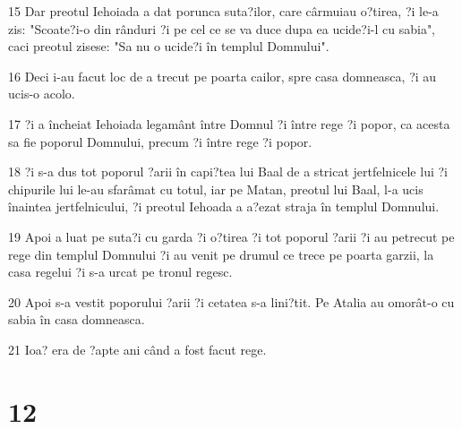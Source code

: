 \par 15 Dar preotul Iehoiada a dat porunca suta?ilor, care cârmuiau o?tirea, ?i le-a zis: "Scoate?i-o din rânduri ?i pe cel ce se va duce dupa ea ucide?i-l cu sabia", caci preotul zisese: "Sa nu o ucide?i în templul Domnului".
\par 16 Deci i-au facut loc de a trecut pe poarta cailor, spre casa domneasca, ?i au ucis-o acolo.
\par 17 ?i a încheiat Iehoiada legamânt între Domnul ?i între rege ?i popor, ca acesta sa fie poporul Domnului, precum ?i între rege ?i popor.
\par 18 ?i s-a dus tot poporul ?arii în capi?tea lui Baal de a stricat jertfelnicele lui ?i chipurile lui le-au sfarâmat cu totul, iar pe Matan, preotul lui Baal, l-a ucis înaintea jertfelnicului, ?i preotul Iehoada a a?ezat straja în templul Domnului.
\par 19 Apoi a luat pe suta?i cu garda ?i o?tirea ?i tot poporul ?arii ?i au petrecut pe rege din templul Domnului ?i au venit pe drumul ce trece pe poarta garzii, la casa regelui ?i s-a urcat pe tronul regesc.
\par 20 Apoi s-a vestit poporului ?arii ?i cetatea s-a lini?tit. Pe Atalia au omorât-o cu sabia în casa domneasca.
\par 21 Ioa? era de ?apte ani când a fost facut rege.

\chapter{12}


